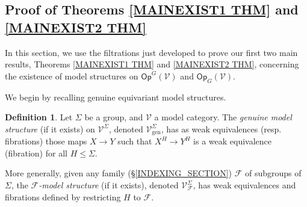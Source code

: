 \documentclass[a4paper,10pt
,draft
]{article}%
\numberwithin{equation}{section}
\numberwithin{figure}{section}
\theoremstyle{definition} %
\newtheorem{definition}[equation]{Definition}%
\newcommand{\Sym}{\ensuremath{\mathsf{Sym}}}%
\DeclareMathOperator{\Lan}{Lan}%
\newcommand{\F}{\ensuremath{\mathcal F}}
\newcommand{\V}{\ensuremath{\mathcal V}}
\renewcommand{\P}{\ensuremath{\mathcal P}}
\newcommand{\1}{\ensuremath{\mathbbm 1}}%
\begin{document}


\subsection{Proof of Theorems \ref{MAINEXIST1 THM} and \ref{MAINEXIST2 THM}}
\label{MAINEXIST SEC}

In this section, we use the filtrations just developed to prove our first two main results,
Theorems \ref{MAINEXIST1 THM} and \ref{MAINEXIST2 THM},
concerning the existence of model structures on 
$\mathsf{Op}^G(\mathcal{V})$
and
$\mathsf{Op}_G(\mathcal{V})$.

We begin by recalling genuine equivariant model structures.
\begin{definition}
      \label{GENUINEMS_DEF}
      Let $\Sigma$ be a group, and $\V$ a model category.
      The \textit{genuine model structure} (if it exists)
      on $\mathcal{V}^{\Sigma}$,
      denoted $\mathcal{V}^{\Sigma}_{\text{gen}}$,
      has as weak equivalences (resp. fibrations)
      those maps $X \to Y$ such that 
      $X^H \to Y^H$ is a weak equivalence (fibration)
      for all $H \leq \Sigma$.

      More generally, given any family (\S \ref{INDEXING_SECTION}) $\F$ of subgroups of $\Sigma$,
      the \textit{$\F$-model structure} (if it exists), denoted $\mathcal V^\Sigma_{\F}$,
      has weak equivalences and fibrations defined by restricting $H$ to $\F$.
\end{definition}
\end{document}

